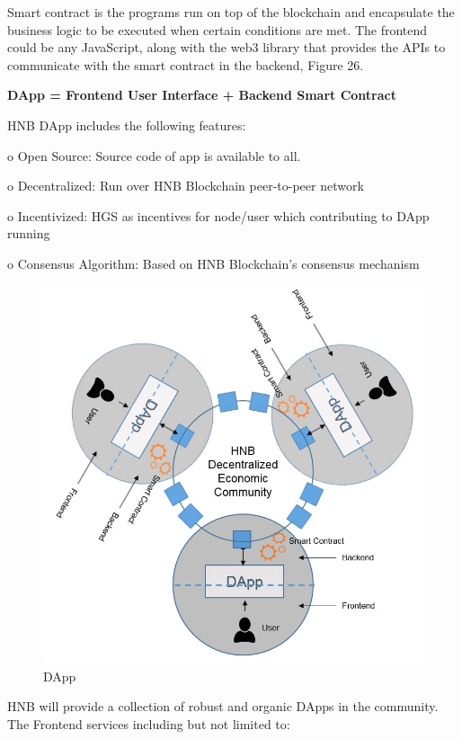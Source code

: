 \documentclass[fleqn,10pt]{SelfArx} %
\begin{document}
Smart contract is the programs run on top of the blockchain and encapsulate the business logic to be executed when certain conditions are met. The frontend could be any JavaScript, along with the web3 library that provides the APIs to communicate with the smart contract in the backend, Figure 26.

\noindent\textbf {DApp = Frontend User Interface + Backend Smart Contract}

HNB DApp includes the following features:

o	Open Source: Source code of app is available to all.

o	Decentralized: Run over HNB Blockchain peer-to-peer network

o	Incentivized: HGS as incentives for node/user which contributing to DApp running

o	Consensus Algorithm: Based on HNB Blockchain’s consensus mechanism\\

\begin{figure}[!hbpt]\centering
\includegraphics[width=\linewidth]{27}
\caption{DApp}
\label{fig:27}
\end{figure}


HNB will provide a collection of robust and organic DApps in the community. The Frontend services including but not limited to:
\end{document}
